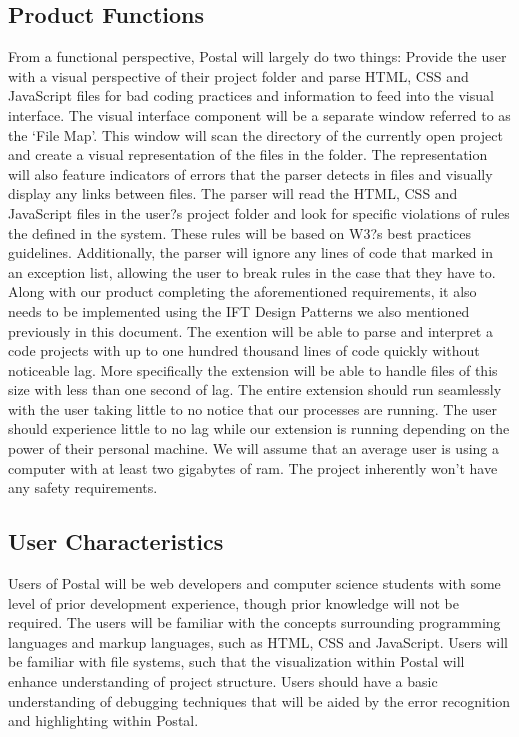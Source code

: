 \documentclass[letterpaper,10pt,titlepage,draftclsnofoot,onecolumn,onesided] {IEEEtran}
\begin{document}
\subsection{Product Functions}
From a functional perspective, Postal will largely do two things: Provide the user with a visual perspective of their project folder and parse HTML, CSS and JavaScript files for bad coding practices and information to feed into the visual interface. 
The visual interface component will be a separate window referred to as the `File Map'.
This window will scan the directory of the currently open project and create a visual representation of the files in the folder.
The representation will also feature indicators of errors that the parser detects in files and visually display any links between files.
The parser will read the HTML, CSS and JavaScript files in the user?s project folder and look for specific violations of rules the defined in the system.
These rules will be based on W3?s best practices guidelines.
Additionally, the parser will ignore any lines of code that marked in an exception list, allowing the user to break rules in the case that they have to.
Along with our product completing the aforementioned requirements, it also needs to be implemented using the IFT Design Patterns we also mentioned previously in this document.
The exention will be able to parse and interpret a code projects with up to one hundred thousand lines of code quickly without noticeable lag. 
More specifically the extension will be able to handle files of this size with less than one second of lag.
The entire extension should run seamlessly with the user taking little to no notice that our processes are running. 
The user should experience little to no lag while our extension is running depending on the power of their personal machine.
We will assume that an average user is using a computer with at least two gigabytes of ram. 
The project inherently won't have any safety requirements. 

\subsection{User Characteristics}
Users of Postal will be web developers and computer science students with some level of prior development experience, though prior knowledge will not be required. 
The users will be familiar with the concepts surrounding programming languages and markup languages, such as HTML, CSS and JavaScript. 
Users will be familiar with file systems, such that the visualization within Postal will enhance understanding of project structure. 
Users should have a basic understanding of debugging techniques that will be aided by the error recognition and highlighting within Postal.
\end{document}
